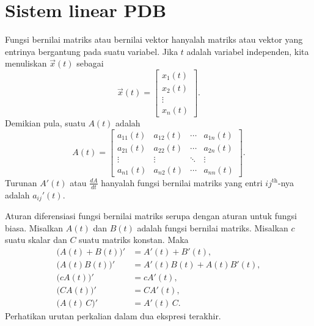 
\sectionnewpage
\section{Sistem linear PDB}
\label{linsystems:section}


Fungsi bernilai matriks atau bernilai vektor
hanyalah matriks atau vektor yang entrinya bergantung pada suatu variabel.
Jika $t$ adalah variabel independen, kita menuliskan
\emph{}
$\vec{x}(t)$ sebagai
\begin{equation*}
\vec{x}(t) = \begin{bmatrix}
x_1(t) \\
x_2(t) \\
\vdots \\
x_n(t)
\end{bmatrix} .
\end{equation*}
Demikian pula, suatu \emph{} $A(t)$ adalah
\begin{equation*}
A(t) =
\begin{bmatrix}
a_{11}(t) & a_{12}(t) & \cdots & a_{1n}(t) \\
a_{21}(t) & a_{22}(t) & \cdots & a_{2n}(t) \\
\vdots & \vdots & \ddots & \vdots \\
a_{n1}(t) & a_{n2}(t) & \cdots & a_{nn}(t)
\end{bmatrix} .
\end{equation*}
Turunan $A'(t)$ atau $\frac{dA}{dt}$
hanyalah fungsi bernilai matriks
yang entri $ij^{\text{th}}$-nya adalah $a_{ij}'(t)$.

Aturan diferensiasi fungsi bernilai matriks
serupa dengan aturan untuk fungsi
biasa.  Misalkan $A(t)$ dan $B(t)$ adalah fungsi bernilai
matriks.  Misalkan $c$ suatu skalar dan $C$ suatu matriks konstan.
Maka
\begin{equation*}
\begin{aligned}
\bigl(A(t)+B(t)\bigr)' & = A'(t) + B'(t), \\
\bigl(A(t)B(t)\bigr)' & = A'(t)B(t) + A(t)B'(t), \\
\bigl(cA(t)\bigr)' & = cA'(t), \\
\bigl(CA(t)\bigr)' & = CA'(t), \\
\bigl(A(t)\,C\bigr)' & = A'(t)\,C .
\end{aligned}
\end{equation*}
Perhatikan urutan perkalian dalam dua ekspresi terakhir.

